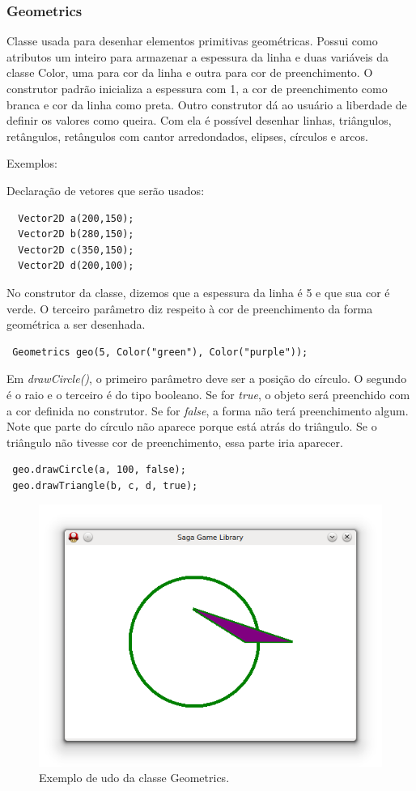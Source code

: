 \subsubsection{Geometrics}
%
%
Classe usada para desenhar elementos primitivas geométricas. Possui como atributos um inteiro para armazenar a espessura da linha e duas variáveis da classe Color, uma para cor da linha e outra para cor de preenchimento. O construtor padrão inicializa a espessura com 1, a cor de preenchimento como branca e cor da linha como preta. Outro construtor dá ao usuário a liberdade de definir os valores como queira. Com ela é possível desenhar linhas, triângulos, retângulos, retângulos com cantor arredondados, elipses, círculos e arcos. 
\par 
Exemplos: 
\par
Declaração de vetores que serão usados:
%
\begin{lstlisting}
  Vector2D a(200,150);
  Vector2D b(280,150);
  Vector2D c(350,150);
  Vector2D d(200,100);
\end{lstlisting}
%
%
\par 
No construtor da classe, dizemos que a espessura da linha é 5 e que sua cor é verde. O terceiro parâmetro diz respeito à cor de preenchimento da forma geométrica a ser desenhada. 
%
\begin{lstlisting}
 Geometrics geo(5, Color("green"), Color("purple"));
\end{lstlisting}
%
Em \textit{drawCircle()}, o primeiro parâmetro deve ser a posição do círculo. O segundo é o raio e o terceiro é do tipo booleano. Se for \textit{true}, o objeto será preenchido com a cor definida no construtor. Se for \textit{false}, a forma não terá preenchimento algum. Note que parte do círculo não aparece porque está atrás do triângulo. Se o triângulo não tivesse cor de preenchimento, essa parte iria aparecer. 
%
\begin{lstlisting}
 geo.drawCircle(a, 100, false);
 geo.drawTriangle(b, c, d, true);
\end{lstlisting}
%
%
%
\begin{figure}[H]
    \centering
    \includegraphics[scale = 0.7]{Imagens/ExemploGeometric.png}
    \caption{Exemplo de udo da classe Geometrics.}
    \label{ExemploGeometric}
\end{figure}
%
%
